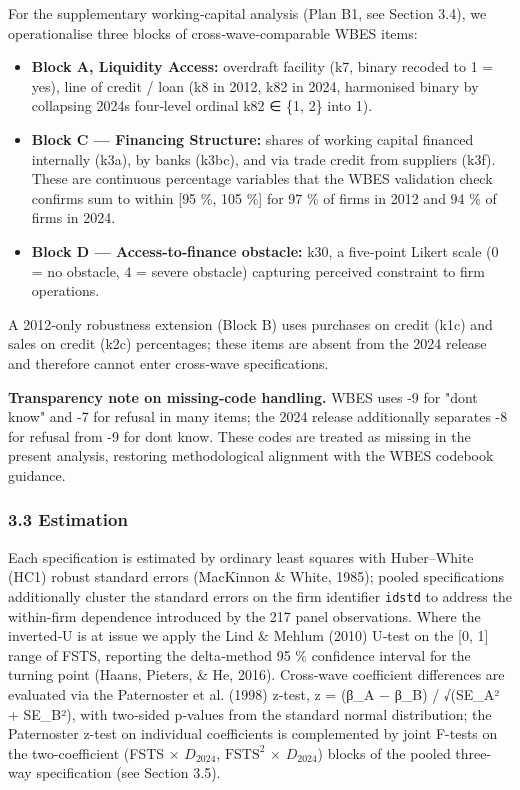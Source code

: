 \documentclass[12pt,a4paper]{article}
\providecommand{\tightlist}{\setlength{\itemsep}{0pt}\setlength{\parskip}{0pt}}
\begin{document}
For the supplementary working‑capital analysis (Plan B1, see Section
3.4), we operationalise three blocks of cross‑wave‑comparable WBES
items:

\begin{itemize}
\tightlist
\item
  \textbf{Block A, Liquidity Access:} overdraft facility (k7, binary
  recoded to 1 = yes), line of credit / loan (k8 in 2012, k82 in 2024,
  harmonised binary by collapsing 2024\textquotesingle s four‑level
  ordinal k82 ∈ \{1, 2\} into 1).
\item
  \textbf{Block C --- Financing Structure:} shares of working capital
  financed internally (k3a), by banks (k3bc), and via trade credit from
  suppliers (k3f). These are continuous percentage variables that the
  WBES validation check confirms sum to within {[}95 \%, 105 \%{]} for
  97 \% of firms in 2012 and 94 \% of firms in 2024.
\item
  \textbf{Block D --- Access‑to‑finance obstacle:} k30, a five‑point
  Likert scale (0 = no obstacle, 4 = severe obstacle) capturing
  perceived constraint to firm operations.
\end{itemize}

A 2012‑only robustness extension (Block B) uses purchases on credit
(k1c) and sales on credit (k2c) percentages; these items are absent from
the 2024 release and therefore cannot enter cross‑wave specifications.

\textbf{Transparency note on missing‑code handling.} WBES uses -9 for
"don\textquotesingle t know" and -7 for refusal in many items; the 2024
release additionally separates -8 for refusal from -9 for
don\textquotesingle t know. These codes are treated as missing in the
present analysis, restoring methodological alignment with the WBES
codebook guidance.

\hypertarget{33-estimation}{%
\subsubsection{3.3 Estimation}\label{33-estimation}}

Each specification is estimated by ordinary least squares with
Huber--White (HC1) robust standard errors (MacKinnon \& White, 1985);
pooled specifications additionally cluster the standard errors on the
firm identifier \texttt{idstd} to address the within-firm dependence
introduced by the 217 panel observations. Where the inverted‑U is at
issue we apply the Lind \& Mehlum (2010) U‑test on the {[}0, 1{]} range
of FSTS, reporting the delta‑method 95 \% confidence interval for the
turning point (Haans, Pieters, \& He, 2016). Cross‑wave coefficient
differences are evaluated via the Paternoster et al. (1998) z‑test, z =
(β\_A − β\_B) / √(SE\_A² + SE\_B²), with two‑sided p‑values from the
standard normal distribution; the Paternoster z-test on individual
coefficients is complemented by joint F-tests on the two-coefficient
(FSTS × \(D_{2024}\), \(\mathrm{FSTS}^2\) × \(D_{2024}\)) blocks of the
pooled three-way specification (see Section 3.5).
\end{document}
